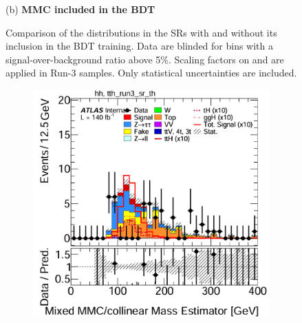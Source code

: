 \begin{figure}[htbp]
\begin{subfigure}[t]{0.45\textwidth}
  \end{subfigure}

  \vspace{0.2cm}
  \begin{minipage}{\textwidth}
    \centering
    \small{(b) \textbf{MMC included in the BDT}}
  \end{minipage}
  \vspace{0.35cm}
  \caption{Comparison of the \mmc distributions in the \ttH SRs with and without its inclusion in the BDT training. Data are blinded for bins with a signal-over-background ratio above 5\%. Scaling factors on \ztautau and \ttbar are applied in Run-3 samples. Only statistical uncertainties are included.}
  \label{mmc_distributions_tth}
\end{figure}


\begin{figure}[htbp]
  \centering
  \begin{subfigure}[t]{0.45\textwidth}
    \centering
    \includegraphics[width=\linewidth]{images/mmc_th_tth/run_2_wo_mmc_th.png}
  \end{subfigure}
  \hfill
  \begin{subfigure}[t]{0.45\textwidth}
    \centering

\end{subfigure}
\end{figure}
